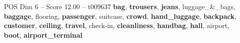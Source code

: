 \begin{textsample}{POS Dim 6 – Score 12.00 – t009637}  \label{ex:f6_pos_036}
\textbf{bag}, \textbf{trousers}, \textbf{jeans}, luggage\_\&\_bags, \textbf{baggage}, flooring, \textbf{passenger}, suitcase, \textbf{crowd}, \textbf{hand\_luggage}, \textbf{backpack}, \textbf{customer}, \textbf{ceiling}, \textbf{travel}, check-in, \textbf{cleanliness}, \textbf{handbag}, \textbf{hall}, airport, \textbf{boot}, \textbf{airport\_terminal}

\end{textsample}
